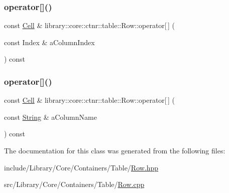 \mbox{\label{classlibrary_1_1core_1_1ctnr_1_1table_1_1_row_a8fd76f9562104b7d92b91a8774609e6f}} 
\subsubsection{\texorpdfstring{operator[]()}{operator[]()}\hspace{0.1cm}{\footnotesize\ttfamily [1/2]}}
{\footnotesize\ttfamily const \mbox{\hyperlink{namespacelibrary_1_1core_1_1ctnr_1_1table_aac6007d595b2967513e8e6b89f6092f5}{Cell}} \& library\+::core\+::ctnr\+::table\+::\+Row\+::operator\mbox{[}$\,$\mbox{]} (\begin{DoxyParamCaption}\item[{const Index \&}]{a\+Column\+Index }\end{DoxyParamCaption}) const}

\mbox{\label{classlibrary_1_1core_1_1ctnr_1_1table_1_1_row_a6415c3a4cfde0e2c1e85fad3f972651a}} 
\subsubsection{\texorpdfstring{operator[]()}{operator[]()}\hspace{0.1cm}{\footnotesize\ttfamily [2/2]}}
{\footnotesize\ttfamily const \mbox{\hyperlink{namespacelibrary_1_1core_1_1ctnr_1_1table_aac6007d595b2967513e8e6b89f6092f5}{Cell}} \& library\+::core\+::ctnr\+::table\+::\+Row\+::operator\mbox{[}$\,$\mbox{]} (\begin{DoxyParamCaption}\item[{const \mbox{\hyperlink{classlibrary_1_1core_1_1types_1_1_string}{String}} \&}]{a\+Column\+Name }\end{DoxyParamCaption}) const}



The documentation for this class was generated from the following files\+:\begin{DoxyCompactItemize}
\item 
include/\+Library/\+Core/\+Containers/\+Table/\mbox{\hyperlink{_row_8hpp}{Row.\+hpp}}\item 
src/\+Library/\+Core/\+Containers/\+Table/\mbox{\hyperlink{_row_8cpp}{Row.\+cpp}}\end{DoxyCompactItemize}

